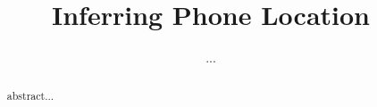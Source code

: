 \documentclass{article}
\begin{document}
\title{Inferring Phone Location}
\author{...}
\maketitle

\begin{abstract}
abstract...
\end{abstract}






\end{document}
